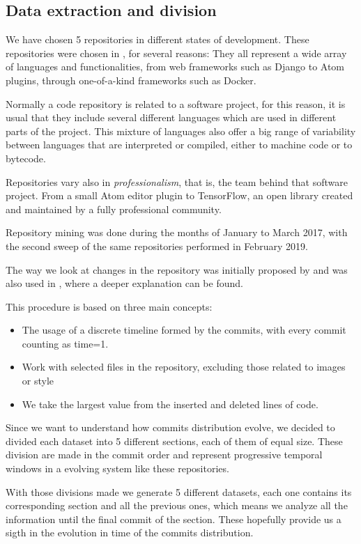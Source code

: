 \documentclass[conference]{IEEEtran}
\begin{document}
\subsection{Data extraction and division}
We have chosen 5 repositories in different states of development.
These repositories were chosen in \cite{Merelo2016:repomining}, for
several reasons: They all represent a wide array of languages and
functionalities, from web frameworks such as Django to Atom plugins,
through one-of-a-kind frameworks such as Docker.

Normally a code repository is related to a software project, for this
reason, it is usual that they include several different languages
which are used in different parts of the project.  This mixture of
languages also offer a big range of variability between languages that
are interpreted or compiled, either to machine code or to bytecode.

Repositories vary also in {\em professionalism}, that is, the team
behind that software project. From a small Atom editor plugin to
TensorFlow, an open library created and maintained by a fully
professional community.

Repository mining was done during the months of January to March 2017,
with the second sweep of the same repositories performed in February
2019.

The way we look at changes in the repository was initially proposed by
\cite{Merelo2016:repomining} and was also used in
\cite{merelo2017self}, where a deeper explanation can be found.


This procedure is based on three main concepts:
\begin{itemize}
\item The usage of a discrete timeline formed by the commits, with
  every commit counting as time=1.
\item Work with selected files in the repository, excluding those
  related to images or style
\item We take the largest value from the inserted and deleted lines of
  code.
\end{itemize}

Since we want to understand how commits distribution evolve, we
decided to divided each dataset into 5 different sections, each of
them of equal size. These division are made in the commit order and
represent progressive temporal windows in a evolving system like these
repositories.

With those divisions made we generate 5 different datasets, each one
contains its corresponding section and all the previous ones, which
means we analyze all the information until the final commit of the
section.  These hopefully provide us a sigth in the evolution in time
of the commits distribution.
\end{document}
